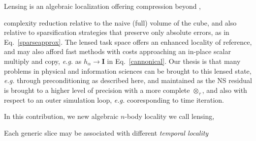 \documentclass[letterpaper,twocolumn,amsmath,amsfont,amssymb,english,aps,jcp,preprintnumbers,groupaddress,nofootinbib,tightenlines,floatfix]{revtex4}
\newcommand{\mat}[1]{\boldsymbol{#1}}
\newcommand{\ot}{  {\scriptstyle \otimes}_{ \tau } }
\theoremstyle{plain}
\theoremstyle{remark}
\theoremstyle{plain}
\begin{document}
Lensing is an algebraic localization offering compression beyond  , 

complexity reduction relative to the naive (full) volume of the cube,
and also relative to sparsification strategies that preserve only absolute errors, as in Eq.~\ref{sparseapprox}.  
The lensed task space offers an enhanced locality of reference, and may also afford fast methods 
with costs approaching an in-place scalar multiply and copy, {\em e.g.} as $h_\alpha \rightarrow \mat{I}$ in Eq.~\ref{cannonical}.
Our thesis is that many problems in physical and information sciences can be brought to this lensed state, {\em e.g.} through preconditioning
as described here, and maintained as the NS residual is brought to a higher level of precision with a more complete $\ot$, 
and also with respect to an outer simulation loop, {\em e.g.} cooresponding to time iteration.






 \begin{figure}[h] \label{figzzz}
 \caption{}
 \end{figure}





 

In this contribution, we new algebraic $n$-body locality we call lensing, 

Each generic slice may be associated with different {\em temporal locality}
\end{document}
